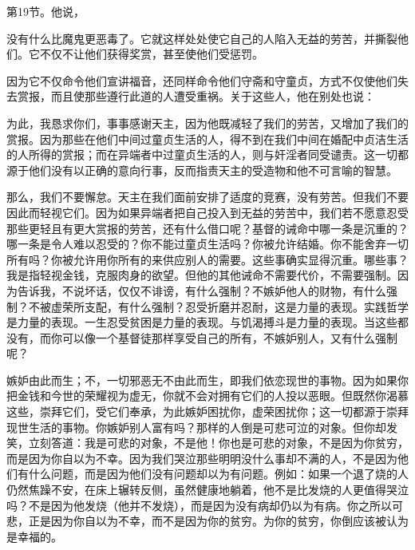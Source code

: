第19节。他说，\par

没有什么比魔鬼更恶毒了。它就这样处处使它自己的人陷入无益的劳苦，并撕裂他们。它不仅不让他们获得奖赏，甚至使他们受惩罚。\par

因为它不仅命令他们宣讲福音，还同样命令他们守斋和守童贞，方式不仅使他们失去赏报，而且使那些遵行此道的人遭受重祸。关于这些人，他在别处也说：\par

为此，我恳求你们，事事感谢天主，因为他既减轻了我们的劳苦，又增加了我们的赏报。因为那些在他们中间过童贞生活的人，得不到在我们中间在婚配中贞洁生活的人所得的赏报；而在异端者中过童贞生活的人，则与奸淫者同受谴责。这一切都源于他们没有以正确的意向行事，反而指责天主的受造物和他不可言喻的智慧。\par

那么，我们不要懈怠。天主在我们面前安排了适度的竞赛，没有劳苦。但我们不要因此而轻视它们。因为如果异端者把自己投入到无益的劳苦中，我们若不愿意忍受那些更轻且有更大赏报的劳苦，还有什么借口呢？基督的诫命中哪一条是沉重的？哪一条是令人难以忍受的？你不能过童贞生活吗？你被允许结婚。你不能舍弃一切所有吗？你被允许用你所有的来供应别人的需要。这些事确实显得沉重。哪些事？我是指轻视金钱，克服肉身的欲望。但他的其他诫命不需要代价，不需要强制。因为告诉我，不说坏话，仅仅不诽谤，有什么强制？不嫉妒他人的财物，有什么强制？不被虚荣所支配，有什么强制？忍受折磨并忍耐，这是力量的表现。实践哲学是力量的表现。一生忍受贫困是力量的表现。与饥渴搏斗是力量的表现。当这些都没有，而你可以像一个基督徒那样享受自己的所有，不嫉妒别人，又有什么强制呢？\par

嫉妒由此而生；不，一切邪恶无不由此而生，即我们依恋现世的事物。因为如果你把金钱和今世的荣耀视为虚无，你就不会对拥有它们的人投以恶眼。但既然你渴慕这些，崇拜它们，受它们奉承，为此嫉妒困扰你，虚荣困扰你；这一切都源于崇拜现世生活的事物。你嫉妒别人富有吗？那样的人倒是可悲可泣的对象。但你却发笑，立刻答道：我是可悲的对象，不是他！你也是可悲的对象，不是因为你贫穷，而是因为你自以为不幸。因为我们哭泣那些明明没什么事却不满的人，不是因为他们有什么问题，而是因为他们没有问题却以为有问题。例如：如果一个退了烧的人仍然焦躁不安，在床上辗转反侧，虽然健康地躺着，他不是比发烧的人更值得哭泣吗？不是因为他发烧（他并不发烧），而是因为没有病却仍以为有病。你之所以可悲，正是因为你自以为不幸，而不是因为你的贫穷。为你的贫穷，你倒应该被认为是幸福的。\par

